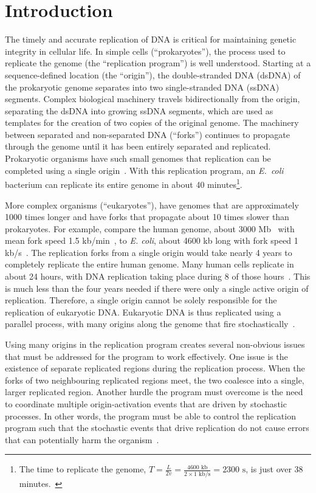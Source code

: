 \chapter{Introduction}
\label{ch:Introduction}

The timely and accurate replication of DNA is critical for maintaining genetic integrity in cellular life.
In simple cells (``prokaryotes''), the process used to replicate the genome (the ``replication program'') is well understood.
Starting at a sequence-defined location (the ``origin''), the double-stranded DNA (dsDNA) of the prokaryotic genome separates into two single-stranded DNA (ssDNA) segments.
Complex biological machinery travels bidirectionally from the origin, separating the dsDNA into growing ssDNA segments, which are used as templates for the creation of two copies of the original genome.
The machinery between separated and non-separated DNA (``forks'') continues to propagate through the genome until it has been entirely separated and replicated.
Prokaryotic organisms have such small genomes that replication can be completed using a single origin~\cite{MolecularCellBiology}.
With this replication program, an \emph{E.~coli} bacterium can replicate its entire genome in about 40 minutes\footnote{
The time to replicate the genome, $T=\frac{L}{2v}=\frac{4600\text{ kb}}{2\times1\text{ kb/s}} = 2300\text{ s}$, is just over 38 minutes.~\cite{EColi}}.

More complex organisms (``eukaryotes''), have genomes that are approximately 1000 times longer and have forks that propagate about 10 times slower than prokaryotes.
For example, compare the human genome, about 3000 Mb~\cite{HumanGenomeLength} with mean fork speed 1.5 kb/min~\cite{HumanForks}, to \emph{E. coli}, about 4600 kb long with fork speed 1 kb/s~\cite{EColi}.
The replication forks from a single origin would take nearly 4 years to completely replicate the entire human genome.
Many human cells replicate in about 24 hours, with DNA replication taking place during 8 of those hours~\cite{CellMolApproach}.
This is much less than the four years needed if there were only a single active origin of replication.
Therefore, a single origin cannot be solely responsible for the replication of eukaryotic DNA.
Eukaryotic DNA is thus replicated using a parallel process, with many origins along the genome that fire stochastically~\cite{eukaryotereview}.

Using many origins in the replication program creates several non-obvious issues that must be addressed for the program to work effectively.
One issue is the existence of separate replicated regions during the replication process.
When the forks of two neighbouring replicated regions meet, the two coalesce into a single, larger replicated region.
Another hurdle the program must overcome is the need to coordinate multiple origin-activation events that are driven by stochastic processes.
In other words, the program must be able to control the replication program such that the stochastic events that drive replication do not cause errors that can potentially harm the organism~\cite{eukaryotereview}.


